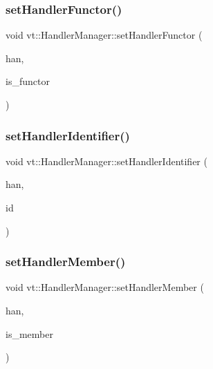 \subsubsection{\texorpdfstring{set\+Handler\+Functor()}{setHandlerFunctor()}}
{\footnotesize\ttfamily void vt\+::\+Handler\+Manager\+::set\+Handler\+Functor (\begin{DoxyParamCaption}\item[{\hyperlink{namespacevt_af64846b57dfcaf104da3ef6967917573}{Handler\+Type} \&}]{han,  }\item[{bool}]{is\+\_\+functor }\end{DoxyParamCaption})\hspace{0.3cm}{\ttfamily [static]}}

\mbox{\label{structvt_1_1_handler_manager_a5501e67dbd88836fecdf434548de0909}} 
\subsubsection{\texorpdfstring{set\+Handler\+Identifier()}{setHandlerIdentifier()}}
{\footnotesize\ttfamily void vt\+::\+Handler\+Manager\+::set\+Handler\+Identifier (\begin{DoxyParamCaption}\item[{\hyperlink{namespacevt_af64846b57dfcaf104da3ef6967917573}{Handler\+Type} \&}]{han,  }\item[{\hyperlink{namespacevt_a59ae068fe828d1c33051ff96f3d016b6}{Handler\+Identifier\+Type}}]{id }\end{DoxyParamCaption})\hspace{0.3cm}{\ttfamily [static]}}

\mbox{\label{structvt_1_1_handler_manager_aca4acd8d7a769a2226931ae1febe6379}} 
\subsubsection{\texorpdfstring{set\+Handler\+Member()}{setHandlerMember()}}
{\footnotesize\ttfamily void vt\+::\+Handler\+Manager\+::set\+Handler\+Member (\begin{DoxyParamCaption}\item[{\hyperlink{namespacevt_af64846b57dfcaf104da3ef6967917573}{Handler\+Type} \&}]{han,  }\item[{bool}]{is\+\_\+member }\end{DoxyParamCaption})\hspace{0.3cm}{\ttfamily [static]}}

